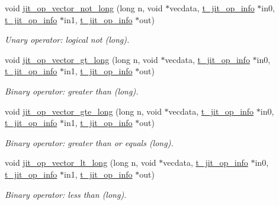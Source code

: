 \begin{DoxyCompactItemize}
void \hyperlink{group__opvecmod_gaa584a1fe47a2f462540d65b00e3db0aa}{jit\_\-op\_\-vector\_\-not\_\-long} (long n, void $\ast$vecdata, \hyperlink{structt__jit__op__info}{t\_\-jit\_\-op\_\-info} $\ast$in0, \hyperlink{structt__jit__op__info}{t\_\-jit\_\-op\_\-info} $\ast$in1, \hyperlink{structt__jit__op__info}{t\_\-jit\_\-op\_\-info} $\ast$out)
\begin{DoxyCompactList}\small\item\em Unary operator: logical not (long). \item\end{DoxyCompactList}\item 
void \hyperlink{group__opvecmod_ga459487a4b3d6adca2f44ddb7e39037ba}{jit\_\-op\_\-vector\_\-gt\_\-long} (long n, void $\ast$vecdata, \hyperlink{structt__jit__op__info}{t\_\-jit\_\-op\_\-info} $\ast$in0, \hyperlink{structt__jit__op__info}{t\_\-jit\_\-op\_\-info} $\ast$in1, \hyperlink{structt__jit__op__info}{t\_\-jit\_\-op\_\-info} $\ast$out)
\begin{DoxyCompactList}\small\item\em Binary operator: greater than (long). \item\end{DoxyCompactList}\item 
void \hyperlink{group__opvecmod_gaf294824ff96797d4145a59b56d2bfaee}{jit\_\-op\_\-vector\_\-gte\_\-long} (long n, void $\ast$vecdata, \hyperlink{structt__jit__op__info}{t\_\-jit\_\-op\_\-info} $\ast$in0, \hyperlink{structt__jit__op__info}{t\_\-jit\_\-op\_\-info} $\ast$in1, \hyperlink{structt__jit__op__info}{t\_\-jit\_\-op\_\-info} $\ast$out)
\begin{DoxyCompactList}\small\item\em Binary operator: greater than or equals (long). \item\end{DoxyCompactList}\item 
void \hyperlink{group__opvecmod_gaa4cb0f4c15c7b67c371696298b705474}{jit\_\-op\_\-vector\_\-lt\_\-long} (long n, void $\ast$vecdata, \hyperlink{structt__jit__op__info}{t\_\-jit\_\-op\_\-info} $\ast$in0, \hyperlink{structt__jit__op__info}{t\_\-jit\_\-op\_\-info} $\ast$in1, \hyperlink{structt__jit__op__info}{t\_\-jit\_\-op\_\-info} $\ast$out)
\begin{DoxyCompactList}\small\item\em Binary operator: less than (long). \item\end{DoxyCompactList}\item 

\end{DoxyCompactItemize}
